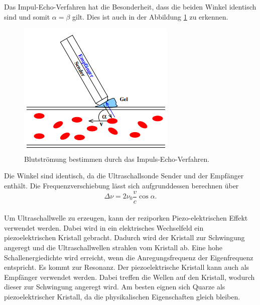 Das Impul-Echo-Verfahren hat die Besonderheit, dass die beiden Winkel identisch sind und somit $\alpha = \beta$ gilt.
Dies ist auch in der Abbildung \ref{fig:IEV} zu erkennen.
\begin{figure}[H]
    \centering
    \includegraphics[scale=0.5]{content/TheoBild.png}
    \caption{Blutströmung bestimmen durch das Impuls-Echo-Verfahren.}
    \label{fig:IEV}
\end{figure}
Die Winkel sind identisch, da die Ultraschallsonde Sender und der Empfänger enthält.
Die Frequenzverschiebung lässt sich aufgrunddessen berechnen über
\begin{equation}
    \Delta \nu = 2 \nu_0 \frac{v}{c} \cos \alpha.
    \label{eq:deltaf}
\end{equation}
\\

\noindent Um Ultraschallwelle zu erzeugen, kann der reziporken Piezo-elektrischen Effekt verwendet werden.
Dabei wird in ein elektrisches Wechselfeld ein piezoelektrischen Kristall gebracht.
Dadurch wird der Kristall zur Schwingung angeregt und die Ultraschallwellen strahlen vom Kristall ab.
Eine hohe Schallenergiedichte wird erreicht, wenn die Anregungsfrequenz der Eigenfrequenz entspricht.
Es kommt zur Resonanz.
Der piezoelektrische Kristall kann auch als Empfänger verwendet werden.
Dabei treffen die Wellen auf den Kristall, wodurch dieser zur Schwingung angeregt wird.
Am besten eignen sich Quarze als piezoelektrischer Kristall, da die physikalischen Eigenschaften gleich bleiben.

\cite{sample}
